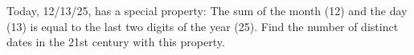 Today, 12/13/25, has a special property: The sum of the month (12) and the day (13) is equal to the last two digits of the year (25). Find the number of distinct dates in the 21st century with this property.
